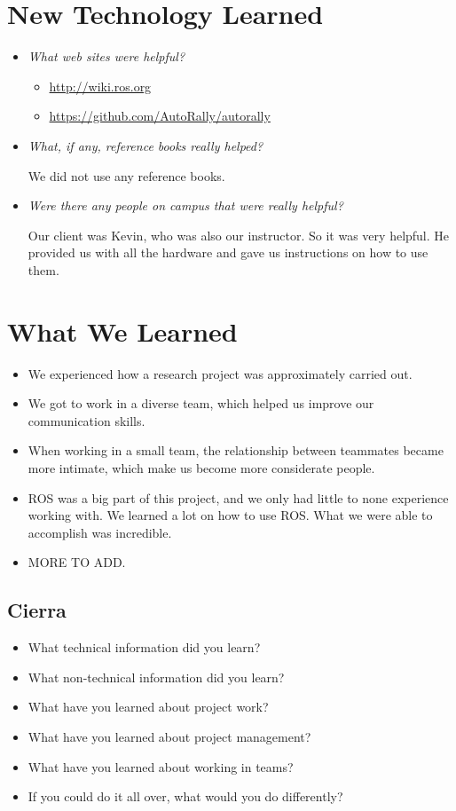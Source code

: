 \documentclass[compsoc,draftclsnofoot,onecolumn,10pt]{IEEEtran}
\begin{document}
\section{New Technology Learned}
\begin{itemize}
    \item \textit{What web sites were helpful?}
      \begin{itemize}
        \item \url{http://wiki.ros.org}
        \item \url{https://github.com/AutoRally/autorally}
      \end{itemize}
    \item \textit{What, if any, reference books really helped?}\par
      We did not use any reference books.
    \item \textit{Were there any people on campus that were really helpful?}\par
      Our client was Kevin, who was also our instructor. So it was very helpful.
      He provided us with all the hardware and gave us instructions on how to use them.
\end{itemize}

\section{What We Learned}
  \begin{itemize}
    \item We experienced how a research project was approximately carried out.
    \item We got to work in a diverse team, which helped us improve our
    communication skills.
    \item When working in a small team, the relationship between teammates became
    more intimate, which make us become more considerate people.
    \item ROS was a big part of this project, and we only had little to none
    experience working with. We learned a lot on how to use ROS. What we were able
    to accomplish was incredible.
    \item MORE TO ADD.
  \end{itemize}

\subsection{Cierra}
\begin{itemize}
    \item What technical information did you learn?
    \item What non-technical information did you learn?
    \item What have you learned about project work?
    \item What have you learned about project management?
    \item What have you learned about working in teams?
    \item If you could do it all over, what would you do differently?
\end{itemize}
\end{document}
